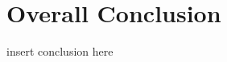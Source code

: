 \graphicspath{{chapt_dutch/}{intro/}{chapt2/}{chapt3/}{chapt4/}}

\renewcommand\evenpagerightmark{{\scshape\small Conclusion}}
\renewcommand\oddpageleftmark{{\scshape\small Conclusion}}

\hyphenation{}

\chapter[Overall Conclusion]%
 {Overall Conclusion}

insert conclusion here

\lipsum


\clearpage{\pagestyle{empty}\cleardoublepage}
